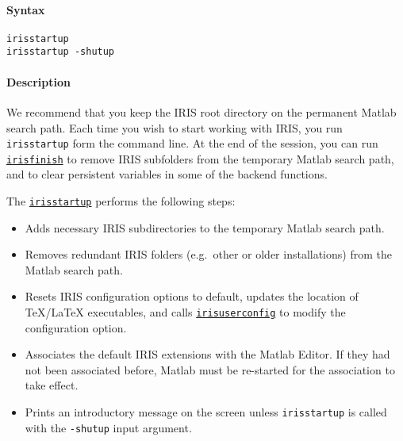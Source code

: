 


	\paragraph{Syntax}

\begin{verbatim}
irisstartup
irisstartup -shutup
\end{verbatim}

\paragraph{Description}

We recommend that you keep the IRIS root directory on the permanent
Matlab search path. Each time you wish to start working with IRIS, you
run \texttt{irisstartup} form the command line. At the end of the
session, you can run \href{config/irisfinish}{\texttt{irisfinish}} to
remove IRIS subfolders from the temporary Matlab search path, and to
clear persistent variables in some of the backend functions.

The \href{config/irisstartup}{\texttt{irisstartup}} performs the
following steps:

\begin{itemize}
\item
  Adds necessary IRIS subdirectories to the temporary Matlab search
  path.
\item
  Removes redundant IRIS folders (e.g.~other or older installations)
  from the Matlab search path.
\item
  Resets IRIS configuration options to default, updates the location of
  TeX/LaTeX executables, and calls
  \href{config/irisuserconfighelp}{\texttt{irisuserconfig}} to modify
  the configuration option.
\item
  Associates the default IRIS extensions with the Matlab Editor. If they
  had not been associated before, Matlab must be re-started for the
  association to take effect.
\item
  Prints an introductory message on the screen unless
  \texttt{irisstartup} is called with the \texttt{-shutup} input
  argument.
\end{itemize}



